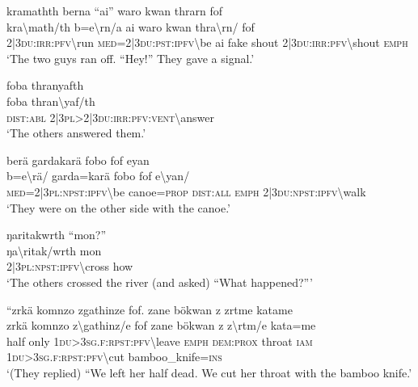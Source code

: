 \ea\label{ex:5:a1583}
kramathth berna ``ai'' waro kwan thrarn fof\\
\gll kra{\textbackslash}math/th	b=e{\textbackslash}rn/a	ai	waro	kwan	thra{\textbackslash}rn/	fof\\
     2|3\textsc{du}:\textsc{irr}:\textsc{pfv}{\textbackslash}run	\textsc{med}=2|3\textsc{du}:\textsc{pst}:\textsc{ipfv}{\textbackslash}be	ai	fake	shout	2|3\textsc{du}:\textsc{irr}:\textsc{pfv}{\textbackslash}shout	\textsc{emph}\\
\glt `The two guys ran off. ``Hey!'' They gave a signal.'
\z

\ea\label{ex:5:a1585}
foba thranyafth\\
\gll foba	thran{\textbackslash}yaf/th\\
     \textsc{dist}:\textsc{abl}	2|3\textsc{pl}>2|3\textsc{du}:\textsc{irr}:\textsc{pfv}:\textsc{vent}{\textbackslash}answer\\
\glt `The others answered them.'
\z

\ea\label{ex:5:a1586}
berä gardakarä fobo fof eyan\\
\gll b=e{\textbackslash}rä/	garda=karä	fobo	fof	e{\textbackslash}yan/\\
     \textsc{med}=2|3\textsc{pl}:\textsc{npst}:\textsc{ipfv}{\textbackslash}be	canoe=\textsc{prop}	\textsc{dist}:\textsc{all}	\textsc{emph}	2|3\textsc{du}:\textsc{npst}:\textsc{ipfv}{\textbackslash}walk\\
\glt `They were on the other side with the canoe.'
\z

\ea\label{ex:5:a1588}
ŋaritakwrth ``mon?''\\
\gll ŋa{\textbackslash}ritak/wrth	mon\\
     2|3\textsc{pl}:\textsc{npst}:\textsc{ipfv}{\textbackslash}cross	how\\
\glt `The others crossed the river (and asked) ``What happened?'''
\z

\ea\label{ex:5:a1589}
``zrkä komnzo zgathinze fof. zane bökwan z zrtme katame\\
\gll zrkä	komnzo	z{\textbackslash}gathinz/e	fof	zane	bökwan	z	z{\textbackslash}rtm/e	kata=me\\
     half	only	1\textsc{du}>3\textsc{sg}.\textsc{f}:\textsc{rpst}:\textsc{pfv}{\textbackslash}leave	\textsc{emph}	\textsc{dem}:\textsc{prox}	throat	\textsc{iam}	1\textsc{du}>3\textsc{sg}.\textsc{f}:\textsc{rpst}:\textsc{pfv}{\textbackslash}cut	bamboo\_knife=\textsc{ins}\\
\glt `(They replied) ``We left her half dead. We cut her throat with the bamboo knife.'
\z


